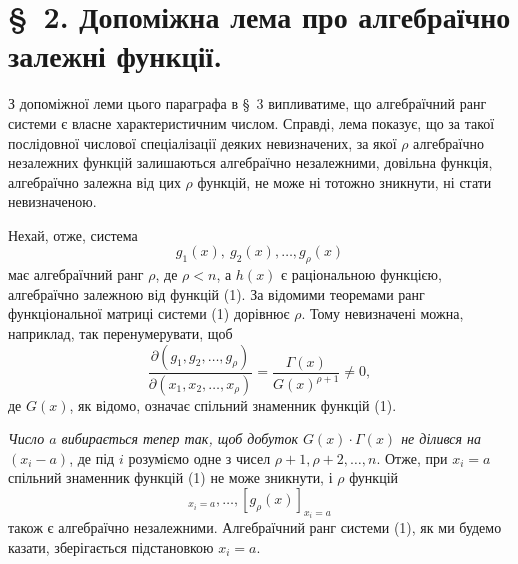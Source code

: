 \documentclass[11pt]{article}
\begin{document}
\section*{\S\ 2. Допоміжна лема про алгебраїчно залежні функції.}

З допоміжної леми цього параграфа в \S\ 3 випливатиме, що алгебраїчний ранг системи є власне характеристичним числом. Справді, лема показує, що за такої послідовної числової спеціалізації деяких невизначених, за якої $\rho$ алгебраїчно незалежних функцій залишаються алгебраїчно незалежними, довільна функція, алгебраїчно залежна від цих $\rho$ функцій, не може ні тотожно зникнути, ні стати невизначеною.

Нехай, отже, система
\begin{equation}
  g_1(x),\ g_2(x),\ldots,g_\rho(x)
\tag{1}
\end{equation}
має алгебраїчний ранг $\rho$, де $\rho<n$, а $h(x)$ є раціональною функцією, алгебраїчно залежною від функцій (1). За відомими теоремами ранг функціональної матриці системи (1) дорівнює $\rho$. Тому невизначені можна, наприклад, так перенумерувати, щоб
\begin{equation}
 \frac{\partial(g_1,g_2,\ldots,g_\rho)}{\partial(x_1,x_2,\ldots,x_\rho)}
 =\frac{\Gamma(x)}{G(x)^{\rho+1}}\ne0,
\tag{2}
\end{equation}
де $G(x)$, як відомо, означає спільний знаменник функцій (1).

\emph{Число $a$ вибирається тепер так, щоб добуток $G(x)\cdot\Gamma(x)$ не ділився на $(x_i-a)$}, де під $i$ розуміємо одне з чисел $\rho+1,\rho+2,\ldots,n$. Отже, при $x_i=a$ спільний знаменник функцій (1) не може зникнути, і $\rho$ функцій
\begin{equation}
  [g_1(x)]_{x_i=a},\ldots,[g_\rho(x)]_{x_i=a}
\tag{3}
\end{equation}
також є алгебраїчно незалежними. Алгебраїчний ранг системи (1), як ми будемо казати, зберігається підстановкою $x_i=a$.
\end{document}
